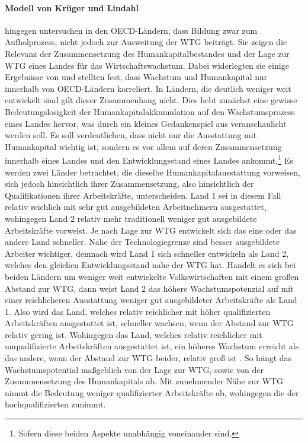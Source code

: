 \paragraph{Modell von Krüger und Lindahl}
\citet{Krueger.2001} hingegen untersuchen in den OECD-L{\"a}ndern, dass Bildung zwar zum Aufholprozess, nicht jedoch zur Ausweitung der WTG beitr{\"a}gt.
Sie zeigen die Relevanz der Zusammensetzung des Humankapitalbestandes und der Lage zur WTG eines Landes f{\"u}r das Wirtschaftswachstum. Dabei widerlegten sie einige Ergebnisse von \citet{Benhabib.1994} und stellten fest, dass Wachstum und Humankapital nur innerhalb von OECD-L{\"a}ndern korreliert. In Ländern, die deutlich weniger weit entwickelt sind gilt dieser Zusammenhang nicht. Dies hebt zun{\"a}chst eine gewisse Bedeutungslosigkeit der Humankapitalakkumulation auf den Wachstumsprozess eines Landes hervor, was durch ein kleines Gedankenspiel aus \citet{Krueger.2001} veranschaulicht werden soll. Es soll verdeutlichen, dass nicht nur die Ausstattung mit Humankapital wichtig ist, sondern es vor allem auf deren Zusammensetzung innerhalb eines Landes und den Entwicklungsstand eines Landes ankommt.\footnote{Sofern diese beiden Aspekte unabhängig voneinander sind.} Es werden zwei Länder betrachtet, die dieselbe Humankapitalausstattung vorweisen, sich jedoch hinsichtlich ihrer Zusammensetzung, also hinsichtlich der Qualifikationen ihrer Arbeitskr{\"a}fte, unterscheiden. Land 1 sei in diesem Fall relativ reichlich mit sehr gut ausgebildeten Arbeitnehmern ausgestattet, wohingegen Land 2 relativ mehr traditionell weniger gut ausgebildete Arbeitskräfte vorweist. Je nach Lage zur WTG entwickelt sich das eine oder das andere Land schneller. Nahe der Technologiegrenze sind besser ausgebildete Arbeiter wichtiger, demnach wird Land 1 sich schneller entwickeln als Land 2, welches den gleichen Entwicklungsstand nahe der WTG hat. Handelt es sich bei beiden Ländern um weniger weit entwickelte Volkswirtschaften mit einem gro{\ss}en Abstand zur WTG, dann weist Land 2 das höhere Wachstumspotenzial auf mit einer reichlicheren Ausstattung weniger gut ausgebildeter Arbeitskräfte als Land 1. Also wird das Land, welches relativ reichlicher mit h{\"o}her qualifizierten Arbeitskr{\"a}ften ausgestattet ist, schneller wachsen, wenn der Abstand zur WTG relativ gering ist. Wohingegen das Land, welches relativ reichlicher mit unqualifizierte Arbeitskr{\"a}ften ausgestattet ist, ein h{\"o}heres Wachstum erreicht als das andere, wenn der Abstand zur WTG beider, relativ gro{\ss} ist \citep{Krueger.2001}. So h{\"a}ngt das Wachstumspotential ma{\ss}geblich von der Lage zur WTG, sowie von der Zusammensetzung des Humankapitals ab. Mit zunehmender N{\"a}he zur WTG nimmt die Bedeutung weniger qualifizierter Arbeitskr{\"a}fte ab, wohingegen die der hochqualifizierten zunimmt.\\



